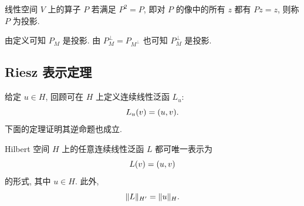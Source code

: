 \begin{Definition}
\label{def:ch02-projection-operator}
线性空间 $V$ 上的算子 $P$ 若满足 $P^2=P$, 即对 $P$ 的像中的所有 $z$ 都有 $Pz=z$, 则称 $P$ 为投影.
\end{Definition}

\begin{Remark}
\label{rem:ch02-pm-is-projection}
由定义可知 $P_M$ 是投影. 由 $P_M^\perp=P_{M^\perp}$ 也可知 $P_M^\perp$ 是投影.
\end{Remark}

\subsection{Riesz 表示定理}
\label{sec:ch02-riesz-representation}
\setcounter{thmcount}{0}
\setcounter{equation}{0}

给定 $u\in H$, 回顾可在 $H$ 上定义连续线性泛函 $L_u$:
\begin{equation}
\MathBookFormulaID{formula-ch02-lu-functional}
L_u(v)=(u,v).
\label{eq:ch02-lu-functional}
\end{equation}
下面的定理证明其逆命题也成立.

\setcounter{thmcount}{1}
\begin{Theorem}
\label{thm:ch02-riesz-representation}
Hilbert 空间 $H$ 上的任意连续线性泛函 $L$ 都可唯一表示为
\setcounter{equation}{2}
\begin{equation}
\MathBookFormulaID{formula-ch02-riesz-representation}
L(v)=(u,v)
\label{eq:ch02-riesz-representation}
\end{equation}
的形式, 其中 $u\in H$. 此外,
\begin{equation}
\MathBookFormulaID{formula-ch02-riesz-norm-identity}
\|L\|_{H'}=\|u\|_H.
\label{eq:ch02-riesz-norm-identity}
\end{equation}
\end{Theorem}


